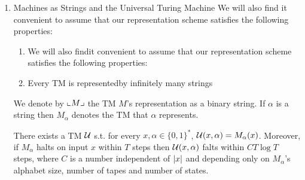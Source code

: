 \documentclass[11pt]{article}
\begin{document}
\begin{enumerate}
\begin{remark}
One can ensure that the proof of Proposition \ref{prop1.6} yields a TM \(\tilde{M}\) with the
following property: its head movements do not depend on the input but only depend on the input
length. That is, every input \(x\in\{0,1\}^*\) and \(i\in\N\), the location of each of \(M\)'s
at the \(i\)th step of execution on input \(x\) is only a function of \(\abs{x}\) and \(i\). A
machine with this property is called \textbf{oblivious}.
\end{remark}

\begin{proposition}[]
Define a bidirectional TM to be a TM whose tapes are infinite in both directions. For
every \(f:\{0,1\}^*\to\{0,1\}^*\) and time-constructible \(T:\N\to\N\) if \(f\) is computable in
time \(T(n)\) by a directional TM M, then it is computable in time \(4T(n)\) by a standard
(undirectional) TM \(\tilde{M}\)
\end{proposition}

\begin{proof}
\begin{center}
\texttt{[image: /media/wu/file/stuuudy/notes/images/ComputationalComplexity/2.png]}
\end{center}

If \(M\) uses alphabet \(\Gamma\), then \(\tilde{M}\) will use the alphabet \(\Gamma^2\) 
\end{proof}

\item Machines as Strings and the Universal Turing Machine
\label{sec:orgd4d8f00}
We will also find it convenient to assume that our representation scheme satisfies the following
properties:
\begin{enumerate}
\item We will also findit convenient to assume that our representation scheme satisfies the
following properties:
\item Every TM is representedby infinitely many strings
\end{enumerate}

We denote by \(\llcorner M \lrcorner\) the TM \(M\)'s representation as a binary string. If \(\alpha\) is a string
then \(M_\alpha\) denotes the TM that \(\alpha\) represents.

\begin{theorem}
\label{thm1.9}
There exists a TM \(\mathcal{U}\) s.t. for
every \(x,\alpha\in\{0,1\}^*\), \(\mathcal{U}(x,\alpha)=M_\alpha(x)\). Moreover, if \(M_{\alpha}\) halts on
input \(x\) within \(T\) steps then \(\mathcal{U}(x,\alpha)\) falts within \(CT\log T\) steps, where \(C\)
is a number independent of \(\abs{x}\) and depending only on \(M_\alpha\)'s alphabet size,
number of tapes and number of states.
\end{theorem}


\end{enumerate}
\end{document}
